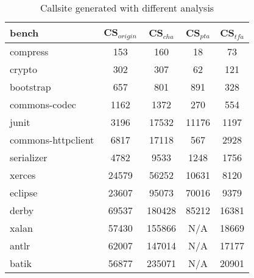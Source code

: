 \documentclass{llncs}
\begin{document}
\begin{table}[!htbp]\centering
\caption{Callsite generated with different analysis}
\begin{tabular}{lcccc}
	\hline
	\textbf{bench} & \textbf{CS$_{origin}$} & \textbf{CS$_{cha}$} & \textbf{CS$_{pta}$} & \textbf{CS$_{tfa}$} \\
	\hline
	compress & 153 & 160 & 18 & 73 \\
	crypto & 302 & 307 & 62 & 121 \\
	bootstrap & 657 & 801 & 891 & 328 \\
	commons-codec & 1162 & 1372 & 270 & 554 \\
	junit & 3196 & 17532 & 11176 & 1197 \\
	commons-httpclient & 6817 & 17118 & 567 & 2928 \\
	serializer & 4782 & 9533 & 1248 & 1756 \\
	xerces & 24579 & 56252 & 10631 & 8120 \\
	eclipse & 23607 & 95073 & 70016 & 9379 \\
	derby & 69537 & 180428 & 85212 & 16381 \\
	xalan & 57430 & 155866 & N/A & 18669 \\
	antlr & 62007 & 147014 & N/A & 17177 \\
	batik & 56877 & 235071 & N/A & 20901 \\
	\hline
\end{tabular}
\label{experiment:Callsite}
\end{table}




\end{document}
